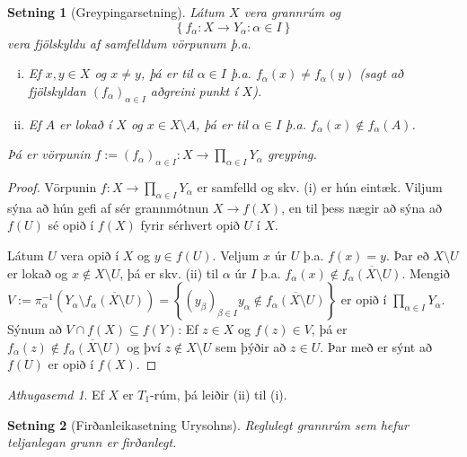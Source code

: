 \documentclass[a4paper,icelandic]{book}
\theoremstyle{definition}
\theoremstyle{plain}
\newtheorem{setn}{Setning}[section]
\theoremstyle{remark}
\newtheorem*{ath}{Athugasemd}
\begin{document}
\begin{setn}
  [Greypingarsetning]

  Látum $X$ vera grannrúm og 
  \[  \left\{ f_\alpha:X\to Y_\alpha :\alpha\in I\right\}  \]
  vera fjölskyldu af samfelldum vörpunum þ.a.
  \begin{enumerate}[(i)]
    \item Ef $x,y\in X$ og $x\neq y$, þá er til $\alpha\in I$ þ.a.
      $f_\alpha(x)\neq f_\alpha(y)$ (sagt að fjölskyldan
      $(f_\alpha)_{\alpha\in I}$ aðgreini punkt í $X$).
    \item Ef $A$ er \emph{lokað} í $X$ og $x\in X\setminus A$, þá er til
      $\alpha\in I$ þ.a. $f_\alpha(x)\notin f_\alpha(A)$. 
  \end{enumerate}
  Þá er vörpunin $f:=(f_\alpha)_{\alpha\in I}:X\to\prod_{\alpha\in
  I}Y_\alpha$ greyping.
\end{setn}
\begin{proof}
  Vörpunin $f:X\to\prod_{\alpha\in I} Y_\alpha$ er samfelld og skv. (i)
  er hún eintæk. Viljum sýna að hún gefi af sér grannmótnun $X\to f(X)$,
  en til þess nægir að sýna að $f(U)$ sé opið í $f(X)$ fyrir sérhvert
  opið $U$ í $X$.

  Látum $U$ vera opið í $X$ og $y\in f(U)$. Veljum $x$ úr $U$ þ.a.
  $f(x)=y$. Þar eð $X\setminus U$ er lokað og $x\notin X\setminus U$, þá
  er skv. (ii) til $\alpha$ úr $I$ þ.a.
  $f_\alpha(x)\notin\overline{f_\alpha(X\setminus U)}$. Mengið
  $V:=\pi_\alpha^{-1}(Y_\alpha\setminus\overline{f_\alpha(X\setminus
  U)}) = \left\{ (y_\beta)_{\beta\in I}
  y_\alpha\notin\overline{f_\alpha(X\setminus U)}\right\}$ er opið í
  $\prod_{\alpha\in I} Y_\alpha$. Sýnum að $V\cap f(X)\subseteq f(Y)$:
  Ef $z\in X$ og $f(z)\in V$, þá er $f_\alpha(z)\notin
  \overline{f_\alpha(X\setminus U)}$ og því $z\notin X\setminus U$ sem
  þýðir að $z\in U$. Þar með er sýnt að $f(U)$ er opið í $f(X)$.
\end{proof}
\begin{ath}
  Ef $X$ er $T_1$-rúm, þá leiðir (ii) til (i).
\end{ath}
\begin{setn}
  [Firðanleikasetning Urysohns]
  Reglulegt grannrúm sem hefur teljanlegan grunn er firðanlegt.
\end{setn}
\end{document}
